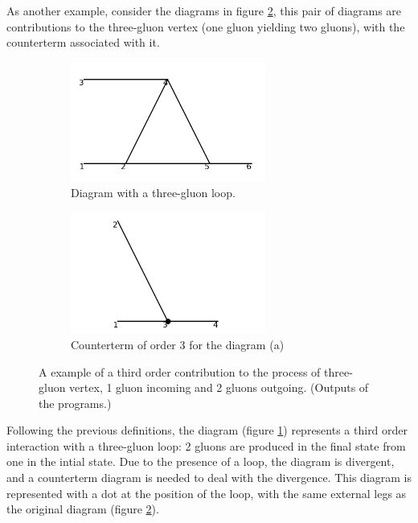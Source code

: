 \documentclass[11pt,a4paper,twoside,pdf]{article}
\numberwithin{equation}{section}
\begin{document}
As another example, consider the diagrams in figure \ref{fig:example_diagram}, this pair of 
diagrams are contributions to the three-gluon vertex (one gluon yielding two gluons), 
with the counterterm associated with it. 

\begin{figure}[h!]
    \centering
    \begin{subfigure}[t]{0.5\textwidth}
        \centering
        \includegraphics[width=0.7\textwidth]{plots/order3/order3_1to2/1.png}
        \caption{Diagram with a three-gluon loop.}
        \label{fig:example_diagram_1}
    \end{subfigure}%
    \begin{subfigure}[t]{0.5\textwidth}
        \centering
        \includegraphics[width=0.7\textwidth]{plots/order3/order3_1to2/counterterms/1.png}
        \caption{Counterterm of order 3 for the diagram (a)}
    \end{subfigure}
    \caption{A example of a third order contribution to the 
    process of three-gluon vertex, 1 gluon incoming and 2 gluons outgoing. (Outputs of 
    the programs.)}
    \label{fig:example_diagram}
\end{figure}

Following the previous definitions, the diagram (figure \ref{fig:example_diagram_1}) represents
a third order interaction with a three-gluon loop: 2 gluons are 
produced in the final state from one in the intial state. Due to the presence of a loop, the diagram is
divergent, and a counterterm diagram is needed to deal with the divergence. This 
diagram is represented with a dot at the position of the loop, with the same 
external legs as the original diagram (figure \ref{fig:example_diagram}). 
\end{document}
